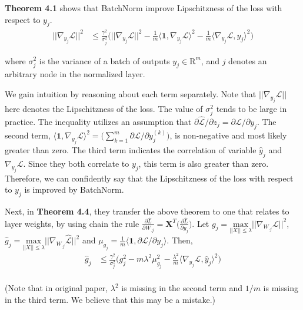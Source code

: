 \documentclass{article}
\begin{document}
\textbf{Theorem 4.1} shows that BatchNorm improve Lipschitzness of the loss with respect to $y_j$.
\begin{align*}
	||\nabla_{y_j}\hat{\mathcal{L}}||^2&\leq\frac{\gamma^2}{\sigma^2_j}\bigg(||\nabla_{y_j}\mathcal{L}||^2
	- \frac{1}{m} \langle \mathbf{1},\nabla_{y_j}\mathcal{L} \rangle^2 
	- \frac{1}{m}\langle \nabla_{y_j}\mathcal{L}, \hat{y}_j \rangle^2 \bigg)
\end{align*}

where $\sigma_j^2$ is the variance of a batch of outputs $y_j\in\mathrm{R}^m$, and $j$ denotes an arbitrary node in the normalized layer. 

We gain intuition by reasoning about each term separately. Note that $||\nabla_{y_j} \mathcal{L}||$ here denotes the Lipschitzness of the loss. The value of $\sigma_j^2$ tends to be large in practice. The inequality utilizes an assumption that $\partial \hat{\mathcal{L}}/\partial z_j = \partial \mathcal{L}/\partial y_j$. The second term, $ \langle \mathbf{1},\nabla_{y_j}\mathcal{L} \rangle^2=\big( \sum_{k=1}^{m}\partial \mathcal{L}/\partial y_j^{(k)} \big)$, is non-negative and most likely greater than zero. The third term indicates the correlation of variable $\hat{y}_j$ and $\nabla_{y_j}\mathcal{L}$. Since they both correlate to $y_j$, this term is also greater than zero. Therefore, we can confidently say that the Lipschitzness of the loss with respect to $y_j$ is improved by BatchNorm.

Next, in \textbf{Theorem 4.4}, they transfer the above theorem to one that relates to layer weights, by using chain the rule $\frac{\partial\hat{L}}{\partial W_{.j}}=\textbf{X}^T\big(\frac{\partial\hat{L}}{\partial y_{j}}\big)$. Let $g_j=\underset{||X||\leq\lambda}{\mathrm{max}}\big|\big|\nabla_{W_{\cdot j}}\mathcal{L}\big|\big|^2$, $\hat{g}_j=\underset{||X||\leq\lambda}{\mathrm{max}}\big|\big|\nabla_{W_{\cdot j}}\hat{\mathcal{L}}\big|\big|^2$ and $\mu_{g_j}=\frac{1}{m}\langle\mathbf{1},\partial\mathcal{L}/\partial y_j\rangle$. Then,
\begin{align*}
	\hat{g}_j &\leq 
	\frac{\gamma^2}{\sigma_j^2}\Bigg(
	g_j^2 - m\lambda^2\mu^2_{g_j}-\frac{\lambda^2}{m}\langle\nabla_{y_j}\mathcal{L},\hat{y}_j\rangle^2
	\Bigg)\\
\end{align*}

(Note that in original paper, $\lambda^2$ is missing in the second term and $1/m$ is missing in the third term. We believe that this may be a mistake.)
\end{document}
